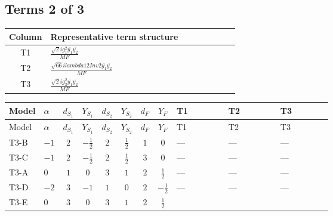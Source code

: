 \documentclass[8pt]{article}
\begin{document}
\begin{landscape}
\subsection*{Terms 2 of 3}
\begin{center}
\begin{tabular}{@{}c >{\raggedright\arraybackslash}p{0.82\linewidth}@{}}
\toprule
Column & Representative term structure \\
\midrule
T1 & \(\displaystyle \frac{\sqrt{2} i g_{1}^{2} \overline{y_{1}} \overline{y_{2}}}{MF}\) \\
\midrule
T2 & \(\displaystyle \frac{\sqrt{66} i lambda12Inv2 \overline{y_{1}} \overline{y_{2}}}{MF}\) \\
\midrule
T3 & \(\displaystyle \frac{\sqrt{2} i g_{2}^{2} \overline{y_{1}} \overline{y_{2}}}{MF}\) \\
\midrule
\bottomrule
\end{tabular}
\end{center}
\smallskip
\tiny
\begin{longtable}{@{}llcccccc >{\raggedright\arraybackslash}p{0.21\linewidth} >{\raggedright\arraybackslash}p{0.21\linewidth} >{\raggedright\arraybackslash}p{0.21\linewidth}@{}}
\toprule
Model & $\alpha$ & $d_{S_1}$ & $Y_{S_1}$ & $d_{S_2}$ & $Y_{S_2}$ & $d_F$ & $Y_F$ & T1 & T2 & T3 \\
\midrule
\endfirsthead
\toprule
Model & $\alpha$ & $d_{S_1}$ & $Y_{S_1}$ & $d_{S_2}$ & $Y_{S_2}$ & $d_F$ & $Y_F$ & T1 & T2 & T3 \\
\midrule
\endhead
T3-B & $-1$ & $2$ & $-\frac{1}{2}$ & $2$ & $\frac{1}{2}$ & $1$ & $0$ & --- & --- & --- \\
\midrule
T3-C & $-1$ & $2$ & $-\frac{1}{2}$ & $2$ & $\frac{1}{2}$ & $3$ & $0$ & --- & --- & --- \\
\midrule
T3-A & $0$ & $1$ & $0$ & $3$ & $1$ & $2$ & $\frac{1}{2}$ & --- & --- & --- \\
\midrule
T3-D & $-2$ & $3$ & $-1$ & $1$ & $0$ & $2$ & $-\frac{1}{2}$ & --- & --- & --- \\
\midrule
T3-E & $0$ & $3$ & $0$ & $3$ & $1$ & $2$ & $\frac{1}{2}$ & \scriptsize\adjustbox{max width=\linewidth}{$\begin{gathered} \frac{3 \sqrt{2} i g_{1}^{2} \overline{y_{1}} \overline{y_{2}}}{16 MF}\end{gathered}$} & \scriptsize\adjustbox{max width=\linewidth}{$\begin{gathered} \frac{3 \sqrt{66} i lambda12Inv2 \overline{y_{1}} \overline{y_{2}}}{44 MF}\end{gathered}$} & \scriptsize\adjustbox{max width=\linewidth}{$\begin{gathered} \frac{49 \sqrt{2} i g_{2}^{2} \overline{y_{1}} \overline{y_{2}}}{16 MF}\end{gathered}$} \\
\midrule
\bottomrule
\end{longtable}
\clearpage

\end{landscape}
\end{document}
